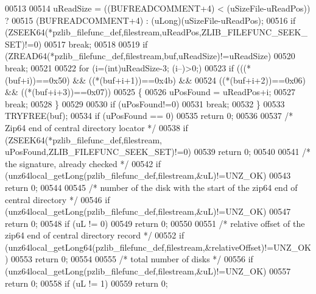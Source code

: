 \begin{DoxyCode}
00513 
00514         uReadSize = ((BUFREADCOMMENT+4) < (uSizeFile-uReadPos)) ?
00515                      (BUFREADCOMMENT+4) : (uLong)(uSizeFile-uReadPos);
00516         \textcolor{keywordflow}{if} (ZSEEK64(*pzlib\_filefunc\_def,filestream,uReadPos,ZLIB\_FILEFUNC\_SEEK\_SET)!=0)
00517             \textcolor{keywordflow}{break};
00518 
00519         \textcolor{keywordflow}{if} (ZREAD64(*pzlib\_filefunc\_def,filestream,buf,uReadSize)!=uReadSize)
00520             \textcolor{keywordflow}{break};
00521 
00522         \textcolor{keywordflow}{for} (i=(\textcolor{keywordtype}{int})uReadSize-3; (i--)>0;)
00523             \textcolor{keywordflow}{if} (((*(buf+i))==0x50) && ((*(buf+i+1))==0x4b) &&
00524                 ((*(buf+i+2))==0x06) && ((*(buf+i+3))==0x07))
00525             \{
00526                 uPosFound = uReadPos+i;
00527                 \textcolor{keywordflow}{break};
00528             \}
00529 
00530         \textcolor{keywordflow}{if} (uPosFound!=0)
00531             \textcolor{keywordflow}{break};
00532     \}
00533     TRYFREE(buf);
00534     \textcolor{keywordflow}{if} (uPosFound == 0)
00535         \textcolor{keywordflow}{return} 0;
00536 
00537     \textcolor{comment}{/* Zip64 end of central directory locator */}
00538     \textcolor{keywordflow}{if} (ZSEEK64(*pzlib\_filefunc\_def,filestream, uPosFound,ZLIB\_FILEFUNC\_SEEK\_SET)!=0)
00539         \textcolor{keywordflow}{return} 0;
00540 
00541     \textcolor{comment}{/* the signature, already checked */}
00542     \textcolor{keywordflow}{if} (unz64local\_getLong(pzlib\_filefunc\_def,filestream,&uL)!=UNZ\_OK)
00543         \textcolor{keywordflow}{return} 0;
00544 
00545     \textcolor{comment}{/* number of the disk with the start of the zip64 end of  central directory */}
00546     \textcolor{keywordflow}{if} (unz64local\_getLong(pzlib\_filefunc\_def,filestream,&uL)!=UNZ\_OK)
00547         \textcolor{keywordflow}{return} 0;
00548     \textcolor{keywordflow}{if} (uL != 0)
00549         \textcolor{keywordflow}{return} 0;
00550 
00551     \textcolor{comment}{/* relative offset of the zip64 end of central directory record */}
00552     \textcolor{keywordflow}{if} (unz64local\_getLong64(pzlib\_filefunc\_def,filestream,&relativeOffset)!=UNZ\_OK)
00553         \textcolor{keywordflow}{return} 0;
00554 
00555     \textcolor{comment}{/* total number of disks */}
00556     \textcolor{keywordflow}{if} (unz64local\_getLong(pzlib\_filefunc\_def,filestream,&uL)!=UNZ\_OK)
00557         \textcolor{keywordflow}{return} 0;
00558     \textcolor{keywordflow}{if} (uL != 1)
00559         \textcolor{keywordflow}{return} 0;

\end{DoxyCode}
